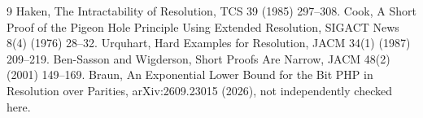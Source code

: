 \documentclass[11pt]{article}
\begin{document}
\begin{thebibliography}{9}
 Haken, The Intractability of Resolution, TCS 39 (1985) 297--308.
 Cook, A Short Proof of the Pigeon Hole Principle Using Extended Resolution, SIGACT News 8(4) (1976) 28--32.
 Urquhart, Hard Examples for Resolution, JACM 34(1) (1987) 209--219.
 Ben-Sasson and Wigderson, Short Proofs Are Narrow, JACM 48(2) (2001) 149--169.
 Braun, An Exponential Lower Bound for the Bit PHP in Resolution over Parities, arXiv:2609.23015 (2026), not independently checked here.
\end{thebibliography}
\end{document}
